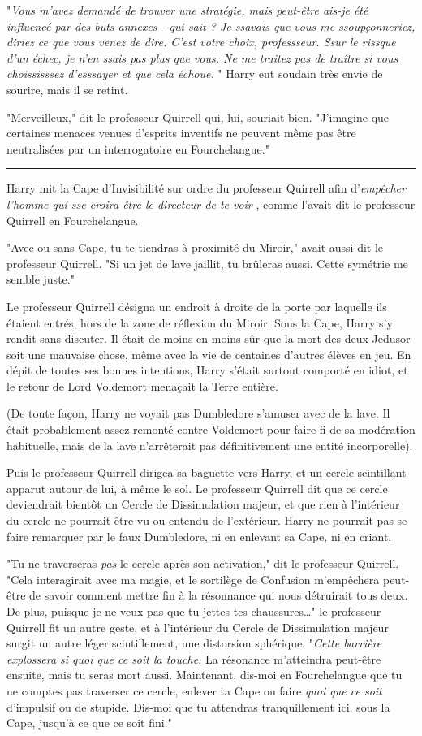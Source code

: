 "\emph{Vous m'avez demandé de trouver une stratégie, mais peut-être ais-je été influencé par des buts annexes - qui sait ? Je ssavais que vous me ssoupçonneriez, diriez ce que vous venez de dire. C'est votre choix, professseur. Ssur le rissque d'un échec, je n'en ssais pas plus que vous. Ne me traitez pas de traître si vous choississsez d'esssayer et que cela échoue.} " Harry eut soudain très envie de sourire, mais il se retint.

"Merveilleux," dit le professeur Quirrell qui, lui, souriait bien. "J'imagine que certaines menaces venues d'esprits inventifs ne peuvent même pas être neutralisées par un interrogatoire en Fourchelangue."
\par\noindent\rule{\textwidth}{0.4pt}
Harry mit la Cape d'Invisibilité sur ordre du professeur Quirrell afin d'\emph{empêcher l'homme qui sse croira être le directeur de te voir} , comme l'avait dit le professeur Quirrell en Fourchelangue.

"Avec ou sans Cape, tu te tiendras à proximité du Miroir," avait aussi dit le professeur Quirrell. "Si un jet de lave jaillit, tu brûleras aussi. Cette symétrie me semble juste."

Le professeur Quirrell désigna un endroit à droite de la porte par laquelle ils étaient entrés, hors de la zone de réflexion du Miroir. Sous la Cape, Harry s'y rendit sans discuter. Il était de moins en moins sûr que la mort des deux Jedusor soit une mauvaise chose, même avec la vie de centaines d'autres élèves en jeu. En dépit de toutes ses bonnes intentions, Harry s'était surtout comporté en idiot, et le retour de Lord Voldemort menaçait la Terre entière.

(De toute façon, Harry ne voyait pas Dumbledore s'amuser avec de la lave. Il était probablement assez remonté contre Voldemort pour faire fi de sa modération habituelle, mais de la lave n'arrêterait pas définitivement une entité incorporelle).

Puis le professeur Quirrell dirigea sa baguette vers Harry, et un cercle scintillant apparut autour de lui, à même le sol. Le professeur Quirrell dit que ce cercle deviendrait bientôt un Cercle de Dissimulation majeur, et que rien à l'intérieur du cercle ne pourrait être vu ou entendu de l'extérieur. Harry ne pourrait pas se faire remarquer par le faux Dumbledore, ni en enlevant sa Cape, ni en criant.

"Tu ne traverseras \emph{pas}  le cercle après son activation," dit le professeur Quirrell. "Cela interagirait avec ma magie, et le sortilège de Confusion m'empêchera peut-être de savoir comment mettre fin à la résonnance qui nous détruirait tous deux. De plus, puisque je ne veux pas que tu jettes tes chaussures…" le professeur Quirrell fit un autre geste, et à l'intérieur du Cercle de Dissimulation majeur surgit un autre léger scintillement, une distorsion sphérique. "\emph{Cette barrière explossera si quoi que ce soit la touche.}  La résonance m'atteindra peut-être ensuite, mais tu seras mort aussi. Maintenant, dis-moi en Fourchelangue que tu ne comptes pas traverser ce cercle, enlever ta Cape ou faire \emph{quoi que ce soit}  d'impulsif ou de stupide. Dis-moi que tu attendras tranquillement ici, sous la Cape, jusqu'à ce que ce soit fini."

